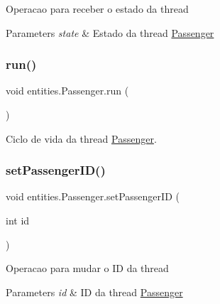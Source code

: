 Operacao para receber o estado da thread 
\begin{DoxyParams}{Parameters}
{\em state} & Estado da thread \hyperlink{classentities_1_1_passenger}{Passenger} \\
\hline
\end{DoxyParams}
\mbox{\label{classentities_1_1_passenger_a7d58b79f61a46da11478760937d80c12}} 
\subsubsection{\texorpdfstring{run()}{run()}}
{\footnotesize\ttfamily void entities.\+Passenger.\+run (\begin{DoxyParamCaption}{ }\end{DoxyParamCaption})\hspace{0.3cm}{\ttfamily [inline]}}

Ciclo de vida da thread \hyperlink{classentities_1_1_passenger}{Passenger}. \mbox{\label{classentities_1_1_passenger_a007debe9191129c632c738311e15a7c4}} 
\subsubsection{\texorpdfstring{set\+Passenger\+I\+D()}{setPassengerID()}}
{\footnotesize\ttfamily void entities.\+Passenger.\+set\+Passenger\+ID (\begin{DoxyParamCaption}\item[{int}]{id }\end{DoxyParamCaption})\hspace{0.3cm}{\ttfamily [inline]}}

Operacao para mudar o ID da thread 
\begin{DoxyParams}{Parameters}
{\em id} & ID da thread \hyperlink{classentities_1_1_passenger}{Passenger} \\
\hline
\end{DoxyParams}
\mbox{\label{classentities_1_1_passenger_a15abb0fe38c3f003d4a7257e8736a562}} 
